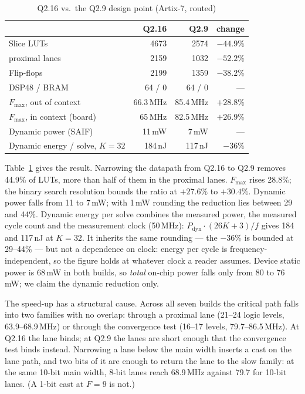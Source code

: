\documentclass[conference]{IEEEtran}
\begin{document}
\begin{table}[t]
\centering\footnotesize
\caption{Q2.16 vs.\ the Q2.9 design point (Artix-7, routed)}
\label{tab:headline}
\begin{tabular}{lrrr}
\toprule
 & Q2.16 & Q2.9 & change \\
\midrule
Slice LUTs                      & 4673 & 2574 & $-44.9\%$ \\
\quad proximal lanes            & 2159 & 1032 & $-52.2\%$ \\
Flip-flops                      & 2199 & 1359 & $-38.2\%$ \\
DSP48 / BRAM                    & 64 / 0 & 64 / 0 & --- \\
$F_{\max}$, out of context      & 66.3\,MHz & 85.4\,MHz & $+28.8\%$ \\
$F_{\max}$, in context (board)  & 65\,MHz & 82.5\,MHz & $+26.9\%$ \\
Dynamic power (SAIF)            & 11\,mW & 7\,mW & --- \\
Dynamic energy / solve, $K=32$ & 184\,nJ & 117\,nJ & $-36\%$ \\
\bottomrule
\end{tabular}
\end{table}

Table~\ref{tab:headline} gives the result. Narrowing the datapath from Q2.16 to
Q2.9 removes 44.9\% of LUTs, more than half of them in the proximal lanes.
$F_{\max}$ rises 28.8\%; the binary search resolution bounds the ratio at
$+27.6\%$ to $+30.4\%$. Dynamic power falls from 11 to 7\,mW; with 1\,mW
rounding the reduction lies between 29 and 44\%. Dynamic energy per solve
combines the measured power, the measured cycle count and the measurement
clock (50\,MHz): $P_{\text{dyn}}\cdot(26K+3)/f$ gives 184 and 117\,nJ at
$K=32$. It inherits the same rounding --- the $-36\%$ is bounded at 29--44\%
--- but not a dependence on clock: energy per cycle is frequency-independent,
so the figure holds at whatever clock a reader assumes. Device static power is 68\,mW
in both builds, so \emph{total} on-chip power falls only from 80 to 76\,mW; we
claim the dynamic reduction only.

The speed-up has a structural cause. Across all seven builds the critical
path falls into two families with no overlap: through a proximal lane
(21--24 logic levels, 63.9--68.9\,MHz) or through the convergence test
(16--17 levels, 79.7--86.5\,MHz). At Q2.16 the lane binds; at Q2.9 the lanes
are short enough that the convergence test binds instead. Narrowing a lane
below the main width inserts a cast on the lane path, and two bits of it are
enough to return the lane to the slow family: at the same 10-bit main width,
8-bit lanes reach 68.9\,MHz against 79.7 for 10-bit lanes. (A 1-bit cast at
$F=9$ is not.)
\end{document}
